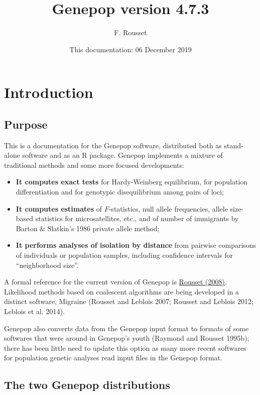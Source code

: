 \documentclass[12pt,]{book}
\title{Genepop version 4.7.3}
\author{F. Rousset}
\date{This documentation: 06 December 2019}
\begin{document}
\maketitle

{
\setcounter{tocdepth}{1}
\tableofcontents
}
\chapter{Introduction}\label{introduction}

\section{Purpose}\label{purpose}

This is a documentation for the Genepop software, distributed both as
stand-alone software and as an R package. Genepop implements a mixture
of traditional methods and some more focused developments:

\begin{itemize}
\item
  \textbf{It computes exact tests} for Hardy-Weinberg equilibrium, for
  population differentiation and for genotypic disequilibrium among
  pairs of loci;
\item
  \textbf{It computes estimates} of \(F\)-statistics, null allele
  frequencies, allele size-based statistics for microsatellites, etc.,
  and of number of immigrants by Barton \& Slatkin's 1986 private allele
  method;
\item
  \textbf{It performs analyses of isolation by distance} from pairwise
  comparisons of individuals or population samples, including confidence
  intervals for ``neighborhood size''.
\end{itemize}

A formal reference for the current version of Genepop is
\href{http://dx.doi.org/10.1111/j.1471-8286.2007.01931.x}{Rousset
(2008)}. Likelihood methods based on coalescent algorithms are being
developed in a distinct software, Migraine (Rousset and Leblois 2007;
Rousset and Leblois 2012; Leblois et al. 2014).

Genepop also converts data from the Genepop input format to formats of
some softwares that were around in Genepop's youth (Raymond and Rousset
1995b); there has been little need to update this option as many more
recent softwares for population genetic analyses read input files in the
Genepop format.

\section{The two Genepop
distributions}\label{the-two-genepop-distributions}
\end{document}
